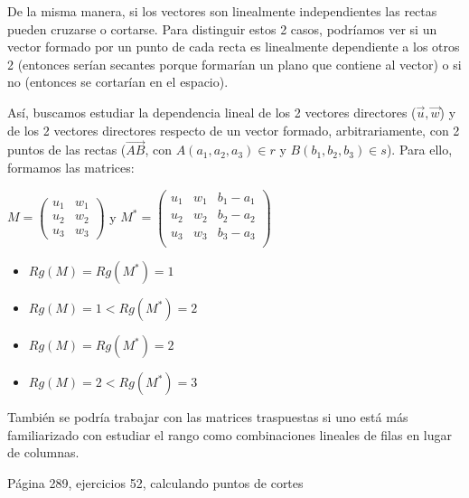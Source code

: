 De la misma manera, si los vectores son linealmente independientes las rectas pueden cruzarse o cortarse. 
%
Para distinguir estos 2 casos, podríamos ver si un vector formado por un punto de cada recta es linealmente dependiente a los otros 2 (entonces serían secantes porque formarían un plano que contiene al vector) o si no (entonces se cortarían en el espacio).

Así, buscamos estudiar la dependencia lineal de los 2 vectores directores ($\vec{u},\vec{w}$) y de los 2 vectores directores respecto de un vector formado, arbitrariamente, con 2 puntos de las rectas ($\vec{AB}$, con $A(a_1,a_2,a_3)\in r$ y $B(b_1,b_2,b_3)\in s$). 
%
Para ello, formamos las matrices:

$M  = \displaystyle\begin{pmatrix}
u_1&w_1\\
u_2&w_2\\
u_3&w_3
\end{pmatrix}
$ y 
$M^* = \displaystyle\begin{pmatrix}
u_1&w_1&b_1-a_1\\
u_2&w_2&b_2-a_2\\
u_3&w_3&b_3-a_3\\
\end{pmatrix}
$

\begin{framed}
  \begin{itemize}
    \item $Rg(M) = Rg(M^*) = 1 $
    \item $Rg(M) = 1 < Rg(M^*) = 2 $ 
    \item $Rg(M) = Rg(M^*) = 2 $
    \item $Rg(M) = 2 < Rg(M^*) = 3 $ 
  \end{itemize}  
\end{framed}
\obs También se podría trabajar con las matrices traspuestas si uno está más familiarizado con estudiar el rango como combinaciones lineales de filas en lugar de columnas.

\begin{problem}
Página 289, ejercicios 52, calculando puntos de cortes
\solution

\end{problem}


